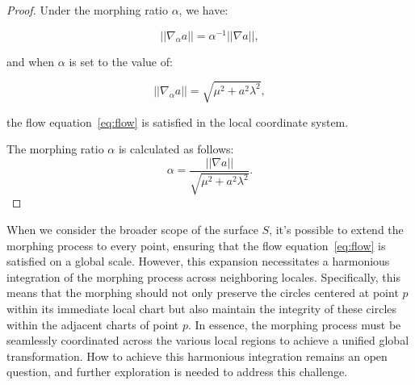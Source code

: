\begin{proof}
    Under the morphing ratio \( \alpha \), we have:

    \begin{equation}
      ||\nabla_\alpha a|| = \alpha^{-1} ||\nabla a||,
    \end{equation}

    and when \( \alpha \) is set to the value of:

    \[ ||\nabla_\alpha a|| = \sqrt{\mu^2 + a^2 \lambda^2}, \]

    the flow equation~\eqref{eq:flow} is satisfied in the local coordinate system.

    The morphing ratio \( \alpha \) is calculated as follows:
    \begin{equation}
        \alpha = \frac{||\nabla a||}{\sqrt{\mu^2 + a^2 \lambda^2}}\label{eq:ratio}.
    \end{equation}
    \qedhere
\end{proof}

When we consider the broader scope of the surface \( S \), it's possible to extend the morphing process to every point,
ensuring that the flow equation~\eqref{eq:flow} is satisfied on a global scale.
However, this expansion necessitates a harmonious integration of the morphing process across neighboring locales.
Specifically, this means that the morphing should not only preserve the circles centered at point \( p \) within its immediate local chart
but also maintain the integrity of these circles within the adjacent charts of point \( p \).
In essence, the morphing process must be seamlessly coordinated across the various local regions to achieve a unified global transformation.
How to achieve this harmonious integration remains an open question, and further exploration is needed to address this challenge.
